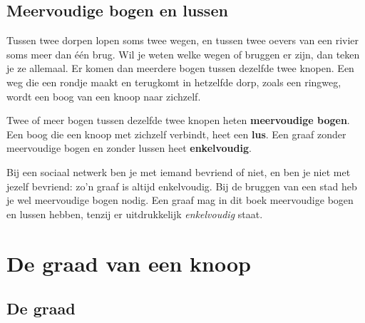 \begin{oefeningen}
\end{oefeningen}

\subsection{Meervoudige bogen en lussen}

Tussen twee dorpen lopen soms twee wegen, en tussen twee oevers van een rivier soms meer dan één brug. Wil je weten welke wegen of bruggen er zijn, dan teken je ze allemaal. Er komen dan meerdere bogen tussen dezelfde twee knopen. Een weg die een rondje maakt en terugkomt in hetzelfde dorp, zoals een ringweg, wordt een boog van een knoop naar zichzelf.


\begin{theorie}
Twee of meer bogen tussen dezelfde twee knopen heten \textbf{\textcolor{accent}{meervoudige bogen}}. Een boog die een knoop met zichzelf verbindt, heet een \textbf{\textcolor{accent}{lus}}. Een graaf zonder meervoudige bogen en zonder lussen heet \textbf{\textcolor{accent}{enkelvoudig}}.
\end{theorie}

Bij een sociaal netwerk ben je met iemand bevriend of niet, en ben je niet met jezelf bevriend: zo'n graaf is altijd enkelvoudig. Bij de bruggen van een stad heb je wel meervoudige bogen nodig. Een graaf mag in dit boek meervoudige bogen en lussen hebben, tenzij er uitdrukkelijk \textit{enkelvoudig} staat.

\section{De graad van een knoop}

\subsection{De graad}

